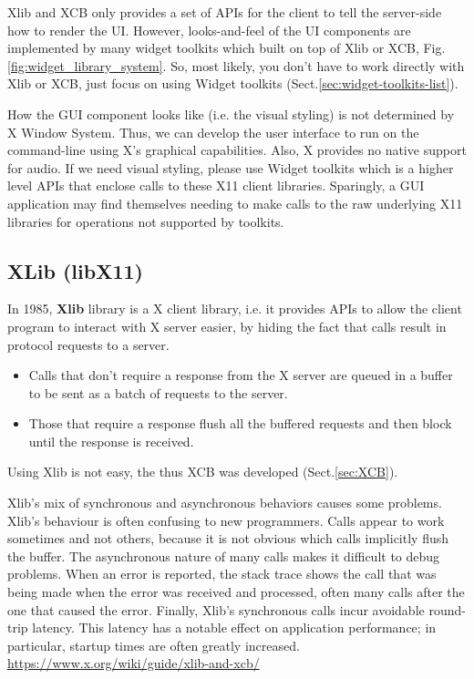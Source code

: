 Xlib and XCB only provides a set of APIs for the client to tell the server-side
how to render the UI. However, looks-and-feel of the UI components are
implemented by many widget toolkits which built on top of Xlib or XCB,
Fig.\ref{fig:widget_library_system}. So, most likely, you don't have to work
directly with Xlib or XCB, just focus on using Widget toolkits
(Sect.\ref{sec:widget-toolkits-list}).

\begin{mdframed}

How the GUI component looks like (i.e. the visual styling) is not determined by X Window
System. Thus, we can develop the user interface to run on the command-line using
X's graphical capabilities. Also, X provides no native support for audio. 
If we need visual styling, please use Widget toolkits which is a higher level
APIs that enclose calls to these X11 client libraries.
Sparingly, a GUI application may find themselves needing to make calls to the
raw underlying X11 libraries for operations not supported by toolkits.

\end{mdframed}

\subsection{XLib (libX11)}
\label{sec:Xlib}
\label{sec:libX11}

In 1985, {\bf Xlib} library is a X client library, i.e. it provides APIs to
allow the client program to interact with X server easier, by hiding the fact
that calls result in protocol requests to a server. 
\begin{itemize}
  
  \item   Calls that don't require a response from the X server are queued in a
  buffer to be sent as a batch of requests to the server.
  
  \item Those that require a response flush all the buffered requests and then
  block until the response is received.
  
\end{itemize}
Using Xlib is not easy, the thus XCB was developed (Sect.\ref{sec:XCB}).

\begin{mdframed}

Xlib's mix of synchronous and asynchronous behaviors causes some problems.
Xlib's behaviour is often confusing to new programmers. Calls appear to work
sometimes and not others, because it is not obvious which calls implicitly flush
the buffer. The asynchronous nature of many calls makes it difficult to debug
problems. When an error is reported, the stack trace shows the call that was
being made when the error was received and processed, often many calls after the
one that caused the error. Finally, Xlib's synchronous calls incur avoidable
round-trip latency. This latency has a notable effect on application
performance; in particular, startup times are often greatly increased.
\url{https://www.x.org/wiki/guide/xlib-and-xcb/}
\end{mdframed}

